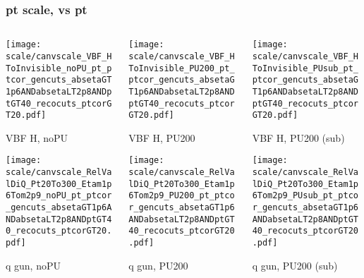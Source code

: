 \documentclass[8pt]{beamer}
\begin{document}
 \begin{frame}
  \frametitle{pt scale, vs pt}
  
  \begin{columns}
   \begin{column}{0.35\textwidth}
     \texttt{[image: scale/canvscale\_VBF\_HToInvisible\_noPU\_pt\_ptcor\_gencuts\_absetaGT1p6ANDabsetaLT2p8ANDptGT40\_recocuts\_ptcorGT20.pdf]}
     
     VBF H, noPU
    
     \texttt{[image: scale/canvscale\_RelValDiQ\_Pt20To300\_Etam1p6Tom2p9\_noPU\_pt\_ptcor\_gencuts\_absetaGT1p6ANDabsetaLT2p8ANDptGT40\_recocuts\_ptcorGT20.pdf]}
     
     q gun, noPU
   \end{column}
   \begin{column}{0.35\textwidth}
     \texttt{[image: scale/canvscale\_VBF\_HToInvisible\_PU200\_pt\_ptcor\_gencuts\_absetaGT1p6ANDabsetaLT2p8ANDptGT40\_recocuts\_ptcorGT20.pdf]}
     
     VBF H, PU200
    
     \texttt{[image: scale/canvscale\_RelValDiQ\_Pt20To300\_Etam1p6Tom2p9\_PU200\_pt\_ptcor\_gencuts\_absetaGT1p6ANDabsetaLT2p8ANDptGT40\_recocuts\_ptcorGT20.pdf]}
     
     q gun, PU200
   \end{column}
   \begin{column}{0.35\textwidth}
     \texttt{[image: scale/canvscale\_VBF\_HToInvisible\_PUsub\_pt\_ptcor\_gencuts\_absetaGT1p6ANDabsetaLT2p8ANDptGT40\_recocuts\_ptcorGT20.pdf]}
     
     VBF H, PU200 (sub)
    
     \texttt{[image: scale/canvscale\_RelValDiQ\_Pt20To300\_Etam1p6Tom2p9\_PUsub\_pt\_ptcor\_gencuts\_absetaGT1p6ANDabsetaLT2p8ANDptGT40\_recocuts\_ptcorGT20.pdf]}
     
     q gun, PU200 (sub)
   \end{column}
  \end{columns}
 \end{frame}
 
\end{document}
